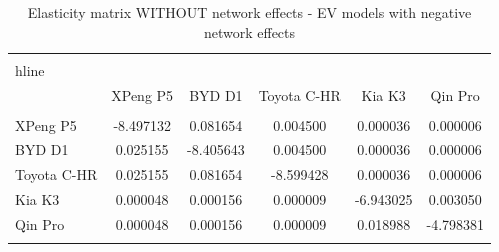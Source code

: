 \begin{table}[!htbp]
\centering
\begin{tabular}{@{\extracolsep{5pt}}lccccc}
\\[-1.8ex]\hline
\\hline \\[-1.8ex]
& XPeng P5 & BYD D1 & Toyota C-HR & Kia K3 & Qin Pro \\
\hline \\[-1.8ex]
XPeng P5 & -8.497132 & 0.081654 & 0.004500 & 0.000036 & 0.000006 \\
BYD D1 & 0.025155 & -8.405643 & 0.004500 & 0.000036 & 0.000006 \\
Toyota C-HR & 0.025155 & 0.081654 & -8.599428 & 0.000036 & 0.000006 \\
Kia K3 & 0.000048 & 0.000156 & 0.000009 & -6.943025 & 0.003050 \\
Qin Pro & 0.000048 & 0.000156 & 0.000009 & 0.018988 & -4.798381 \\
\hline \\[-1.8ex]
\end{tabular}
\caption{Elasticity matrix WITHOUT network effects - EV models with negative network effects}
\end{table}
